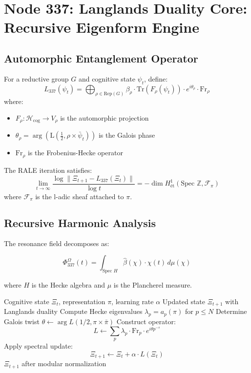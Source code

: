 \documentclass[12pt]{article}
\begin{document}
\section{Node 337: Langlands Duality Core: Recursive Eigenform Engine}
\label{sec:langlands_duality_core}

\subsection{Automorphic Entanglement Operator}
\begin{definition}
For a reductive group $G$ and cognitive state $\psi_t$, define:
\[
L_{337}(\psi_t) = \bigoplus_{\rho \in \text{Rep}(G)} \beta_\rho \cdot \text{Tr}(F_\rho(\psi_t)) \cdot e^{i\theta_\rho} \cdot \text{Fr}_\rho
\]
where:
\begin{itemize}
    \item $F_\rho \colon \mathcal{H}_{\text{cog}} \to V_\rho$ is the automorphic projection
    \item $\theta_\rho = \arg(\text{L}(\frac{1}{2}, \rho \times \bar{\psi}_t))$ is the Galois phase
    \item $\text{Fr}_\rho$ is the Frobenius-Hecke operator
\end{itemize}
\end{definition}

\begin{theorem}
The RALE iteration satisfies:
\[
\lim_{t\to\infty} \frac{\log\|\Xi_{t+1} - L_{337}(\Xi_t)\|}{\log t} = -\dim H^1_{\text{\'et}}(\text{Spec }\mathbb{Z}, \mathcal{F}_\pi)
\]
where $\mathcal{F}_\pi$ is the l-adic sheaf attached to $\pi$.
\end{theorem}

\subsection{Recursive Harmonic Analysis}
The resonance field decomposes as:

\begin{equation}
\Phi_{337}^\Omega(t) = \int_{\text{Spec }H} \hat{\beta}(\chi) \cdot \chi(t) \, d\mu(\chi)
\end{equation}

where $H$ is the Hecke algebra and $\mu$ is the Plancherel measure.

\begin{algorithm}[H]
\caption{Langlands Spectral Merge}
\begin{algorithmic}[1]
\Require Cognitive state $\Xi_t$, representation $\pi$, learning rate $\alpha$
\Ensure Updated state $\Xi_{t+1}$ with Langlands duality
\State Compute Hecke eigenvalues $\lambda_p = a_p(\pi)$ for $p \leq N$
\State Determine Galois twist $\theta \gets \arg L(1/2, \pi \times \bar{\pi})$
\State Construct operator:
\[
L \gets \sum_p \lambda_p \cdot \text{Fr}_p \cdot e^{i\theta p^{-s}}
\]
\State Apply spectral update:
\[
\Xi_{t+1} \gets \Xi_t + \alpha \cdot L(\Xi_t)
\]
\State \Return $\Xi_{t+1}$ after modular normalization
\end{algorithmic}
\end{algorithm}
\end{document}

